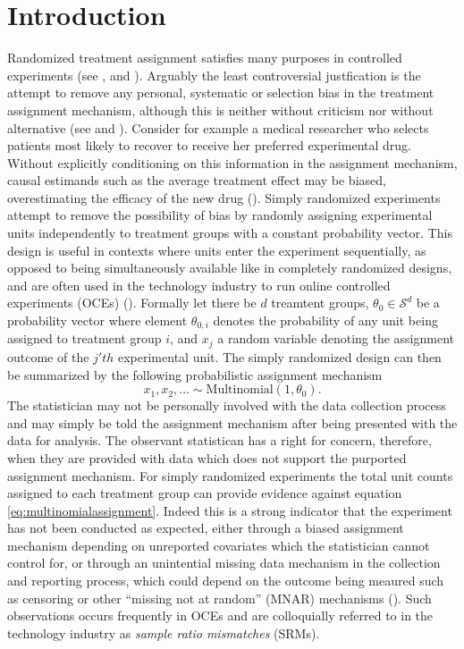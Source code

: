 \documentclass[11pt]{article}
\begin{document}
\section{Introduction}
\label{sec:intro}
Randomized treatment assignment satisfies many purposes in controlled experiments (see \cite{kempthorne}, \cite{cox} and \cite{rubin}). Arguably the least controversial justfication is the attempt to remove any personal, systematic or selection bias in the treatment assignment mechanism, although this is neither without criticism nor without alternative (see \cite{lindley} and \cite{kadane}). Consider for example a medical researcher who selects patients most likely to recover to receive her preferred experimental drug. Without explicitly conditioning on this information in the assignment mechanism, causal estimands such as the average treatment effect may be biased, overestimating the efficacy of the new drug (\cite{berry}).
Simply randomized experiments attempt to remove the possibility of bias by randomly assigning experimental units independently to treatment groups with a constant probability vector.
This design is useful in contexts where units enter the experiment sequentially, as opposed to being simultaneously available like in completely randomized designs, and are often used in the technology industry to run online controlled experiments (OCEs) (\cite{oce}). Formally let there be $d$ treamtent groups, $\theta_0 \in \mathcal{S}^d$ be a probability vector where element $\theta_{0,i}$ denotes the probability of any unit being assigned to treatment group $i$, and $x_j$ a random variable denoting the assignment outcome of the $j'th$ experimental unit. The simply randomized design can then be summarized by the following probabilistic assignment mechanism
\begin{equation}
  \label{eq:multinomialassignment}
  x_1,x_2, \dots \sim \text{Multinomial}(1,\theta_0).
\end{equation}
The statistician may not be personally involved with the data collection process and may simply be told the assignment mechanism after being presented with the data for analysis. The observant statistican has a right for concern, therefore, when they are provided with data which does not support the purported assignment mechanism. For simply randomized experiments the total unit counts assigned to each treatment group can provide evidence against equation \eqref{eq:multinomialassignment}.
Indeed this is a strong indicator that the experiment has not been conducted as expected, either through a biased assignment mechanism depending on unreported covariates which the statistician cannot control for, or through an unintential missing data mechanism in the collection and reporting process, which could depend on the outcome being meaured such as censoring or other ``missing not at random'' (MNAR) mechanisms (\cite{missing-data}).
Such observations occurs frequently in OCEs and are colloquially referred to in the technology industry as \textit{sample ratio mismatches} (SRMs).
\end{document}
